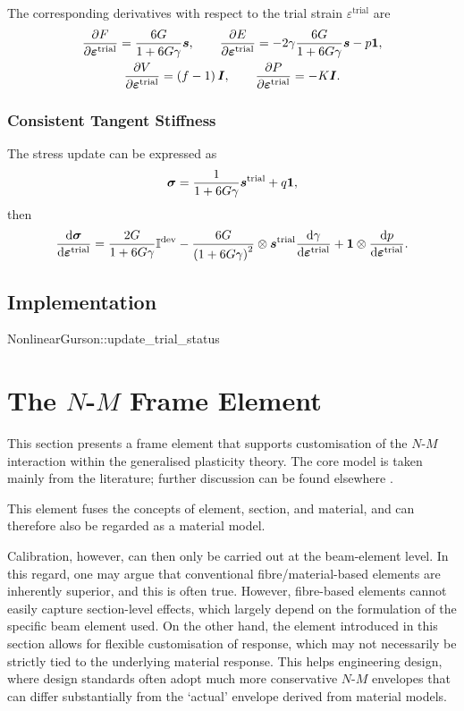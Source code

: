 The corresponding derivatives with respect to the trial strain $\varepsilon^\text{trial}$ are
\begin{gather}
\dfrac{\partial{F}}{\partial{\bm{\varepsilon}^\text{trial}}}=\dfrac{6G}{1+6G\gamma}\bm{s},\qquad
\dfrac{\partial{E}}{\partial{\bm{\varepsilon}^\text{trial}}}=-2\gamma\dfrac{6G}{1+6G\gamma}\bm{s}-p\bm{1},\\
\dfrac{\partial{V}}{\partial{\bm{\varepsilon}^\text{trial}}}=\left(f-1\right)\bm{I},\qquad
\dfrac{\partial{P}}{\partial{\bm{\varepsilon}^\text{trial}}}=-K\bm{I}.
\end{gather}
\subsubsection{Consistent Tangent Stiffness}
The stress update can be expressed as
\begin{gather}
\bm{\sigma}=\dfrac{1}{1+6G\gamma}\bm{s}^\text{trial}+q\bm{1},
\end{gather}
then
\begin{gather}
\dfrac{\mathrm{d}\bm{\sigma}}{\mathrm{d}\bm{\varepsilon}^\text{trial}}=\dfrac{2G}{1+6G\gamma}\mathbb{I}^\text{dev}-\dfrac{6G}{\left(1+6G\gamma\right)^2}\otimes\bm{s}^\text{trial}\dfrac{\mathrm{d}\gamma}{\mathrm{d}\bm{\varepsilon}^\text{trial}}+\bm{1}\otimes\dfrac{\mathrm{d}p}{\mathrm{d}\bm{\varepsilon}^\text{trial}}.
\end{gather}
\subsection{Implementation}
\begin{cppcode}
NonlinearGurson::update_trial_status
\end{cppcode}
\section{The \texorpdfstring{$N$-$M$}{N-M} Frame Element}
This section presents a frame element that supports customisation of the $N$-$M$ interaction within the generalised plasticity theory.
The core model is taken mainly from the literature; further discussion can be found elsewhere \cite{Chang2023}.

This element fuses the concepts of element, section, and material, and can therefore also be regarded as a material model.

Calibration, however, can then only be carried out at the beam-element level.
In this regard, one may argue that conventional fibre/material-based elements are inherently superior, and this is often true.
However, fibre-based elements cannot easily capture section-level effects, which largely depend on the formulation of the specific beam element used.
On the other hand, the element introduced in this section allows for flexible customisation of response, which may not necessarily be strictly tied to the underlying material response.
This helps engineering design, where design standards often adopt much more conservative $N$-$M$ envelopes that can differ substantially from the `actual' envelope derived from material models.
